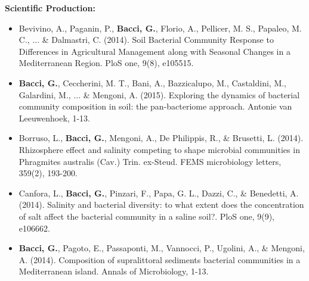 \documentclass[10pt]{beamer}
\begin{document}
\begin{frame}
	\textbf{\Large{Scientific Production:}}
	\footnotesize{%
	\begin{itemize}
		\item Bevivino, A., Paganin, P., \textbf{Bacci, G.}, Florio, A., Pellicer, M. S., Papaleo, M. C., ... \& Dalmastri, C. (2014). Soil Bacterial Community Response to Differences in Agricultural Management along with Seasonal Changes in a Mediterranean Region. PloS one, 9(8), e105515.
		\item \textbf{Bacci, G.}, Ceccherini, M. T., Bani, A., Bazzicalupo, M., Castaldini, M., Galardini, M., ... \& Mengoni, A. (2015). Exploring the dynamics of bacterial community composition in soil: the pan-bacteriome approach. Antonie van Leeuwenhoek, 1-13.
		\item Borruso, L., \textbf{Bacci, G.}, Mengoni, A., De Philippis, R., \& Brusetti, L. (2014). Rhizosphere effect and salinity competing to shape microbial communities in Phragmites australis (Cav.) Trin. ex-Steud. FEMS microbiology letters, 359(2), 193-200.
		\item Canfora, L., \textbf{Bacci, G.}, Pinzari, F., Papa, G. L., Dazzi, C., \& Benedetti, A. (2014). Salinity and bacterial diversity: to what extent does the concentration of salt affect the bacterial community in a saline soil?. PloS one, 9(9), e106662.
		\item \textbf{Bacci, G.}, Pagoto, E., Passaponti, M., Vannocci, P., Ugolini, A., \& Mengoni, A. (2014). Composition of supralittoral sediments bacterial communities in a Mediterranean island. Annals of Microbiology, 1-13.
	\end{itemize}
	}
\end{frame}

\end{document}
